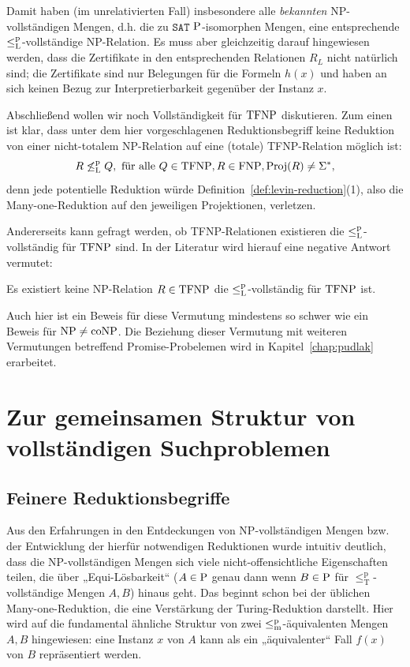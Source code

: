 Damit haben (im unrelativierten Fall) insbesondere alle \emph{bekannten} NP-vollständigen Mengen, d.h. die zu $\mathtt{SAT}$ $\P$-isomorphen Mengen, eine entsprechende $\leqlp$-vollständige NP-Relation.
Es muss aber gleichzeitig darauf hingewiesen werden, dass die Zertifikate in den entsprechenden Relationen $R_L$ nicht natürlich sind; die Zertifikate sind nur Belegungen für die Formeln $h(x)$ und haben an sich keinen Bezug zur Interpretierbarkeit gegenüber der Instanz $x$.

Abschließend wollen wir noch Vollständigkeit für $\TFNP$ diskutieren. Zum einen ist klar, dass unter dem hier vorgeschlagenen Reduktionsbegriff keine Reduktion von einer nicht-totalem NP-Relation auf eine (totale) TFNP-Relation möglich ist: 
\[ R \not\leq_{\mathrm L}^{\mathrm p} Q, \text{ für alle } Q\in\TFNP, R\in\FNP, \Proj(R)\neq\Sigma^*, \]
denn jede potentielle Reduktion würde Definition~\ref{def:levin-reduction}(1), also  die Many-one-Reduktion auf den jeweiligen Projektionen, verletzen.

Andererseits kann gefragt werden, ob TFNP-Relationen existieren die $\leqlp$-vollständig für $\TFNP$ sind. In der Literatur \parencite[vgl.][]{pudlak_incompleteness_2017} wird hierauf eine negative Antwort vermutet:
\begin{conjecture}[\hTFNP]
    Es existiert keine NP-Relation $R\in\TFNP$ die $\leqlp$-vollständig für $\TFNP$ ist.
\end{conjecture}
Auch hier ist ein Beweis für diese Vermutung mindestens so schwer wie ein Beweis für $\NP\neq\coNP$. Die Beziehung dieser Vermutung mit weiteren Vermutungen betreffend Promise-Probelemen wird in Kapitel~\ref{chap:pudlak} erarbeitet.

\section{Zur gemeinsamen Struktur von vollständigen Suchproblemen}\label{sec:gemeinsame-struktur}

\subsection*{Feinere Reduktionsbegriffe}

Aus den Erfahrungen in den Entdeckungen von NP-vollständigen Mengen bzw. der Entwicklung der hierfür notwendigen Reduktionen wurde intuitiv deutlich, dass die NP-vollständigen Mengen sich viele nicht-offensichtliche Eigenschaften teilen, die über „Equi-Lösbarkeit“ ($A\in \P$ genau dann wenn $B\in \P$ für $\leq_\mathrm T^\mathrm p$-vollständige Mengen $A,B$) hinaus geht.
%
Das beginnt schon bei der üblichen Many-one-Reduktion, die eine Verstärkung der Turing-Reduktion darstellt. Hier wird auf die fundamental ähnliche Struktur von zwei $\leqmp$-äquivalenten Mengen $A, B$ hingewiesen: eine Instanz $x$ von $A$ kann als ein „äquivalenter“ Fall $f(x)$ von $B$ repräsentiert werden.

